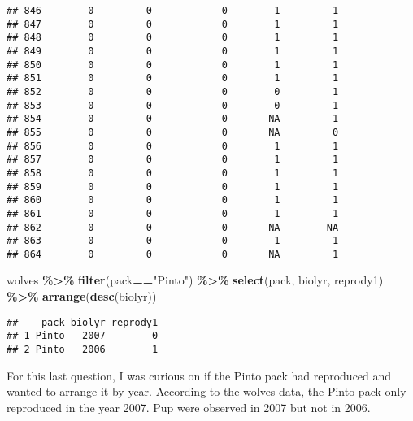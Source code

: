 \documentclass[
]{article}
\newenvironment{Shaded}{\begin{snugshade}}{\end{snugshade}}
\newcommand{\FunctionTok}[1]{\textcolor[rgb]{0.13,0.29,0.53}{\textbf{#1}}}
\newcommand{\NormalTok}[1]{#1}
\newcommand{\SpecialCharTok}[1]{\textcolor[rgb]{0.81,0.36,0.00}{\textbf{#1}}}
\newcommand{\StringTok}[1]{\textcolor[rgb]{0.31,0.60,0.02}{#1}}
\begin{document}
\begin{verbatim}
## 846        0         0            0        1         1
## 847        0         0            0        1         1
## 848        0         0            0        1         1
## 849        0         0            0        1         1
## 850        0         0            0        1         1
## 851        0         0            0        1         1
## 852        0         0            0        0         1
## 853        0         0            0        0         1
## 854        0         0            0       NA         1
## 855        0         0            0       NA         0
## 856        0         0            0        1         1
## 857        0         0            0        1         1
## 858        0         0            0        1         1
## 859        0         0            0        1         1
## 860        0         0            0        1         1
## 861        0         0            0        1         1
## 862        0         0            0       NA        NA
## 863        0         0            0        1         1
## 864        0         0            0       NA         1
\end{verbatim}

\begin{Shaded}
\begin{Highlighting}[]
\NormalTok{wolves }\SpecialCharTok{\%\textgreater{}\%} 
  \FunctionTok{filter}\NormalTok{(pack}\SpecialCharTok{==}\StringTok{"Pinto"}\NormalTok{) }\SpecialCharTok{\%\textgreater{}\%} 
  \FunctionTok{select}\NormalTok{(pack, biolyr, reprody1) }\SpecialCharTok{\%\textgreater{}\%} 
  \FunctionTok{arrange}\NormalTok{(}\FunctionTok{desc}\NormalTok{(biolyr))}
\end{Highlighting}
\end{Shaded}

\begin{verbatim}
##    pack biolyr reprody1
## 1 Pinto   2007        0
## 2 Pinto   2006        1
\end{verbatim}

For this last question, I was curious on if the Pinto pack had
reproduced and wanted to arrange it by year. According to the wolves
data, the Pinto pack only reproduced in the year 2007. Pup were observed
in 2007 but not in 2006.
\end{document}
